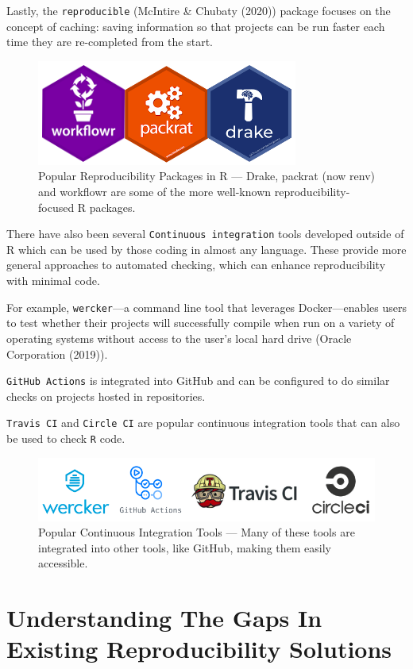 \documentclass[12pt,twoside]{reedthesis}
\begin{document}
Lastly, the \texttt{reproducible} (McIntire \& Chubaty (2020)) package focuses on the concept of caching: saving information so that projects can be run faster each time they are re-completed from the start.
\begin{figure}

{\centering \includegraphics[width=0.5\linewidth]{figure/packages} 

}

\caption{Popular Reproducibility Packages in R --- Drake, packrat (now renv) and workflowr are some of the more well-known reproducibility-focused R packages.}\label{fig:unnamed-chunk-6}
\end{figure}
There have also been several \texttt{Continuous\ integration} tools developed outside of R which can be used by those coding in almost any language. These provide more general approaches to automated checking, which can enhance reproducibility with minimal code.

For example, \texttt{wercker}---a command line tool that leverages Docker---enables users to test whether their projects will successfully compile when run on a variety of operating systems without access to the user's local hard drive (Oracle Corporation (2019)).

\texttt{GitHub\ Actions} is integrated into GitHub and can be configured to do similar checks on projects hosted in repositories.

\texttt{Travis\ CI} and \texttt{Circle\ CI} are popular continuous integration tools that can also be used to check \texttt{R} code.
\begin{figure}

{\centering \includegraphics[width=0.8\linewidth]{figure/ci-tools} 

}

\caption{Popular Continuous Integration Tools --- Many of these tools are integrated into other tools, like GitHub, making them easily accessible.}\label{fig:unnamed-chunk-7}
\end{figure}
\hypertarget{understanding-the-gaps-in-existing-reproducibility-solutions}{%
\section{Understanding The Gaps In Existing Reproducibility Solutions}\label{understanding-the-gaps-in-existing-reproducibility-solutions}}
\end{document}
